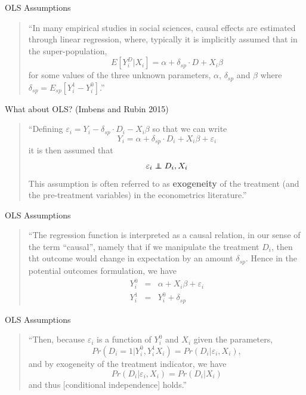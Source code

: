\documentclass{beamer}
\newcommand\independent{\protect\mathpalette{\protect\independenT}{\perp}}
\def\independenT#1#2{\mathrel{\rlap{$#1#2$}\mkern2mu{#1#2}}}
\begin{document}
\begin{frame}{OLS Assumptions}

	\begin{quote} 
	``In many empirical studies in social sciences, causal effects are estimated through linear regression, where, typically it is implicitly assumed that in the super-population, $$E[Y_i^D | X_i] = \alpha + \delta_{sp} \cdot D + X_i \beta$$ for some values of the three unknown parameters, $\alpha$, $\delta_{sp}$ and $\beta$ where $\delta_{sp} = E_{sp} [ Y_i^1 - Y_i^0]$.''
	\end{quote}
	
\end{frame}

\begin{frame}{What about OLS?  (Imbens and Rubin 2015)}

\begin{quote}
``Defining $\varepsilon_i = Y_i - \delta_{sp} \cdot D_i - X_i \beta$ so that we can write $$Y_i = \alpha + \delta_{sp} \cdot D_i + X_i \beta  + \varepsilon_i$$ it is then assumed that $$\varepsilon_i \independent D_i, X_i$$This assumption is often referred to as \textbf{exogeneity} of the treatment (and the pre-treatment variables) in the econometrics literature.''

\end{quote}

\end{frame}

\begin{frame}{OLS Assumptions}

\begin{quote}
``The regression function is interpreted as a causal relation, in our sense of the term ``causal'', namely that if we manipulate the treatment $D_i$, then tht outcome would change in expectation by an amount $\delta_{sp}$.  Hence in the potential outcomes formulation, we have 
\begin{eqnarray*}
Y_i^0 &=& \alpha + X_i \beta + \varepsilon_i \\ 
Y_i^1 &=& Y_i^0 + \delta_{sp}
\end{eqnarray*} 

\end{quote}
	
\end{frame}

\begin{frame}{OLS Assumptions}

\begin{quote}
``Then, because $\varepsilon_i$ is a function of $Y^0_i$ and $X_i$ given the parameters, $$Pr(D_i=1 | Y_i^0, Y_i^1 X_i ) = Pr(D_i | \varepsilon_i, X_i),$$ and by exogeneity of the treatment indicator, we have $$Pr(D_i|\varepsilon_i, X_i) = Pr(D_i | X_i)$$ and thus [conditional independence] holds.'' 
\end{quote}

\end{frame}
\end{document}
